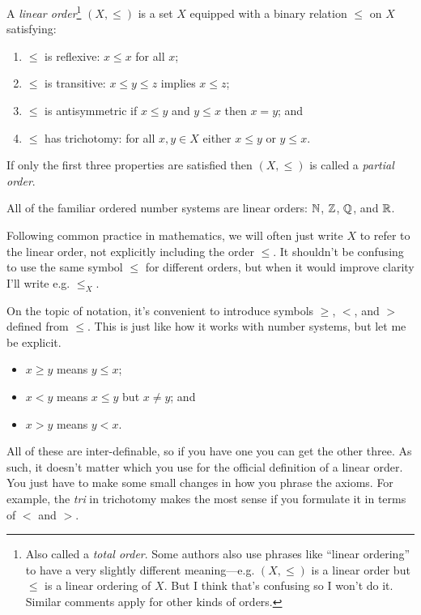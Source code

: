 \documentclass[10pt]{amsart}
\begin{document}
\begin{definition}
A \emph{linear order}\footnote{Also called a \emph{total order}. Some authors also use phrases like ``linear ordering'' to have a very slightly different meaning---e.g. $(X,\le)$ is a linear order but $\le$ is a linear ordering of $X$. But I think that's confusing so I won't do it. Similar comments apply for other kinds of orders.}
$(X,\le)$ is a set $X$ equipped with a binary relation $\le$ on $X$ satisfying:
\begin{enumerate}
\item $\le$ is reflexive: $x \le x$ for all $x$;
\item $\le$ is transitive: $x \le y \le z$ implies $x \le z$; 
\item $\le$ is antisymmetric if $x \le y$ and $y \le x$ then $x = y$; and
\item $\le$ has trichotomy: for all $x,y \in X$ either $x \le y$ or $y \le x$.
\end{enumerate}

If only the first three properties are satisfied then $(X,\le)$ is called a \emph{partial order}.
\end{definition}

All of the familiar ordered number systems are linear orders: $\mathbb{N}$, $\mathbb{Z}$, $\mathbb{Q}$, and $\mathbb{R}$. 
\smallskip

Following common practice in mathematics, we will often just write $X$ to refer to the linear order, not explicitly including the order $\le$. It shouldn't be confusing to use the same symbol $\le$ for different orders, but when it would improve clarity I'll write e.g. $\le_X$.

On the topic of notation, it's convenient to introduce symbols $\ge$, $<$, and $>$ defined from $\le$. This is just like how it works with number systems, but let me be explicit.
\begin{itemize}
\item $x \ge y$ means $y \le x$;
\item $x < y$ means $x \le y$ but $x \ne y$; and
\item $x > y$ means $y < x$.
\end{itemize}

All of these are inter-definable, so if you have one you can get the other three. As such, it doesn't matter which you use for the official definition of a linear order. You just have to make some small changes in how you phrase the axioms. For example, the \emph{tri} in trichotomy makes the most sense if you formulate it in terms of $<$ and $>$.
\end{document}
